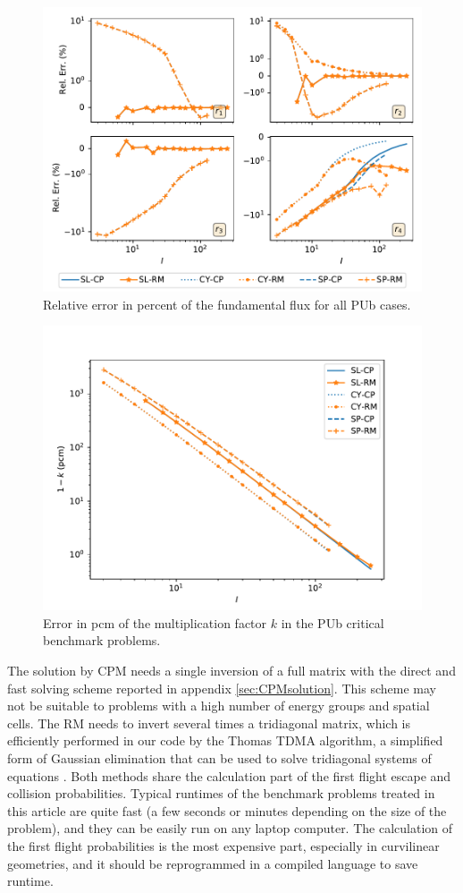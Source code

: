 \documentclass{ictt26}
\begin{document}
\begin{figure}[htbp]
\centering
\includegraphics[width=.8\linewidth]{cpm_PUb_flxerr.pdf}
\caption{Relative error in percent of the fundamental flux for all PUb cases.}
\label{fig:cpm_PUb_flxerr}
\end{figure}
%
\begin{figure}[hbtp]
\centering
\includegraphics[width=.8\linewidth]{cpm_PUb_kerr.pdf}
\caption{Error in pcm of the multiplication factor $k$ in the PUb critical benchmark problems.}
\label{fig:cpm_PUb_kerr}
\end{figure}

The solution by CPM needs a single inversion of a full matrix with the direct and fast solving scheme reported in appendix \ref{sec:CPMsolution}. This scheme may not be suitable to problems with a high number of energy groups and spatial cells. The RM needs to invert several times a tridiagonal matrix, which is efficiently performed in our code by the Thomas TDMA algorithm, a simplified form of Gaussian elimination that can be used to solve tridiagonal systems of equations \cite{quarteroniNM2007}. Both methods share the calculation part of the first flight escape and collision probabilities. Typical runtimes of the benchmark problems treated in this article are quite fast (a few seconds or minutes depending on the size of the problem), and they can be easily run on any laptop computer. The calculation of the first flight probabilities is the most expensive part, especially in curvilinear geometries, and it should be reprogrammed in a compiled language to save runtime.
\end{document}
